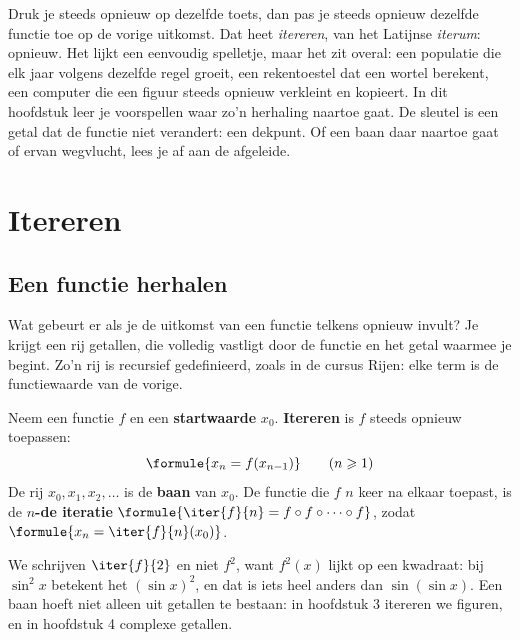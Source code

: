 Druk je steeds opnieuw op dezelfde toets, dan pas je steeds opnieuw dezelfde functie toe op de vorige uitkomst. Dat heet \emph{itereren}, van het Latijnse \textit{iterum}: opnieuw. Het lijkt een eenvoudig spelletje, maar het zit overal: een populatie die elk jaar volgens dezelfde regel groeit, een rekentoestel dat een wortel berekent, een computer die een figuur steeds opnieuw verkleint en kopieert. In dit hoofdstuk leer je voorspellen waar zo'n herhaling naartoe gaat. De sleutel is een getal dat de functie niet verandert: een dekpunt. Of een baan daar naartoe gaat of ervan wegvlucht, lees je af aan de afgeleide.

\begin{oefeningen}[Start]

\end{oefeningen}

\section{Itereren}

\subsection{Een functie herhalen}

Wat gebeurt er als je de uitkomst van een functie telkens opnieuw invult? Je krijgt een rij getallen, die volledig vastligt door de functie en het getal waarmee je begint. Zo'n rij is recursief gedefinieerd, zoals in de cursus Rijen: elke term is de functiewaarde van de vorige.

\begin{theorie}
Neem een functie $f$ en een \textbf{\textcolor{accent}{startwaarde}} $x_0$. \textbf{\textcolor{accent}{Itereren}} is $f$ steeds opnieuw toepassen:
\[
\formule{x_n = f(x_{n-1})} \qquad (n \geqslant 1)
\]
De rij $x_0, x_1, x_2, \ldots$ is de \textbf{\textcolor{accent}{baan}} van $x_0$. De functie die $f$ $n$ keer na elkaar toepast, is de \textbf{\textcolor{accent}{$n$-de iteratie}} $\formule{\iter{f}{n} = f \circ f \circ \cdots \circ f}$, zodat $\formule{x_n = \iter{f}{n}(x_0)}$.
\end{theorie}

We schrijven $\iter{f}{2}$ en niet $f^2$, want $f^2(x)$ lijkt op een kwadraat: bij $\sin^2 x$ betekent het $(\sin x)^2$, en dat is iets heel anders dan $\sin(\sin x)$. Een baan hoeft niet alleen uit getallen te bestaan: in hoofdstuk 3 itereren we figuren, en in hoofdstuk 4 complexe getallen.

